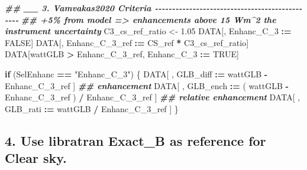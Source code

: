 \documentclass[
  10pt,
  a4paper,oneside]{article}
\newenvironment{Shaded}{\begin{snugshade}}{\end{snugshade}}
\newcommand{\ConstantTok}[1]{\textcolor[rgb]{0.56,0.35,0.01}{#1}}
\newcommand{\ControlFlowTok}[1]{\textcolor[rgb]{0.13,0.29,0.53}{\textbf{#1}}}
\newcommand{\DocumentationTok}[1]{\textcolor[rgb]{0.56,0.35,0.01}{\textbf{\textit{#1}}}}
\newcommand{\FloatTok}[1]{\textcolor[rgb]{0.00,0.00,0.81}{#1}}
\newcommand{\NormalTok}[1]{#1}
\newcommand{\OtherTok}[1]{\textcolor[rgb]{0.56,0.35,0.01}{#1}}
\newcommand{\SpecialCharTok}[1]{\textcolor[rgb]{0.81,0.36,0.00}{\textbf{#1}}}
\newcommand{\StringTok}[1]{\textcolor[rgb]{0.31,0.60,0.02}{#1}}
\begin{document}
\begin{Shaded}
\begin{Highlighting}[]
\DocumentationTok{\#\# \_\_ 3. Vamvakas2020  Criteria  {-}{-}{-}{-}{-}{-}{-}{-}{-}{-}{-}{-}{-}{-}{-}{-}{-}{-}{-}{-}{-}{-}{-}{-}{-}{-}{-}{-}{-}{-}{-}{-}{-}{-}{-}{-}{-}{-}{-}{-}{-}{-}{-}{-}{-}{-}{-}}
\DocumentationTok{\#\# +5\% from model =\textgreater{} enhancements above 15 Wm\^{}2 the instrument uncertainty}
\NormalTok{C3\_cs\_ref\_ratio }\OtherTok{\textless{}{-}} \FloatTok{1.05}
\NormalTok{DATA[, Enhanc\_C\_3 }\SpecialCharTok{:=} \ConstantTok{FALSE}\NormalTok{]}
\NormalTok{DATA[, Enhanc\_C\_3\_ref }\SpecialCharTok{:=}\NormalTok{ CS\_ref }\SpecialCharTok{*}\NormalTok{ C3\_cs\_ref\_ratio]}
\NormalTok{DATA[wattGLB }\SpecialCharTok{\textgreater{}}\NormalTok{ Enhanc\_C\_3\_ref,}
\NormalTok{     Enhanc\_C\_3 }\SpecialCharTok{:=} \ConstantTok{TRUE}\NormalTok{]}

\ControlFlowTok{if}\NormalTok{ (SelEnhanc }\SpecialCharTok{==} \StringTok{"Enhanc\_C\_3"}\NormalTok{) \{}
\NormalTok{    DATA[ , GLB\_diff }\SpecialCharTok{:=}\NormalTok{   wattGLB }\SpecialCharTok{{-}}\NormalTok{ Enhanc\_C\_3\_ref                    ] }\DocumentationTok{\#\# enhancement}
\NormalTok{    DATA[ , GLB\_ench }\SpecialCharTok{:=}\NormalTok{ ( wattGLB }\SpecialCharTok{{-}}\NormalTok{ Enhanc\_C\_3\_ref ) }\SpecialCharTok{/}\NormalTok{ Enhanc\_C\_3\_ref ] }\DocumentationTok{\#\# relative enhancement}
\NormalTok{    DATA[ , GLB\_rati }\SpecialCharTok{:=}\NormalTok{   wattGLB }\SpecialCharTok{/}\NormalTok{ Enhanc\_C\_3\_ref                    ]}
\NormalTok{\}}
\end{Highlighting}
\end{Shaded}

\hypertarget{use-libratran-exact_b-as-reference-for-clear-sky.}{%
\subsection{\texorpdfstring{4. Use libratran \textbf{Exact\_B} as reference for Clear sky.}{4. Use libratran Exact\_B as reference for Clear sky.}}\label{use-libratran-exact_b-as-reference-for-clear-sky.}}
\end{document}
